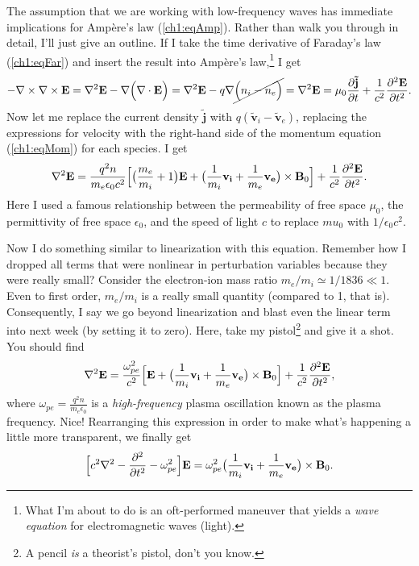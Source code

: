 The assumption that we are working with low-frequency waves has immediate
implications for Amp\`{e}re's law (\ref{ch1:eqAmp}). Rather than walk you
through in detail, I'll just give an outline. If I take the time derivative of
Faraday's law (\ref{ch1:eqFar}) and insert the result into Amp\`{e}re's
law,\footnote{What I'm about to do is an oft-performed maneuver that yields a
  \emph{wave equation} for electromagnetic waves (light).} I get
\begin{equation} - {\bf \nabla} \times {\bf \nabla} \times \mathbf{E} = {\bf \nabla}^2 \mathbf{E} -
  {\bf \nabla} \Big ( {\bf \nabla} \cdot \mathbf{E} \Big ) = {\bf \nabla}^2 \mathbf{E} - q {\bf \nabla}
  \cancel{\Big ( n_i - n_e \Big )} = {\bf \nabla}^2 \mathbf{E} = \mu_0 \dfrac{\partial
    \mathbf{\tilde j}}{\partial t} + \dfrac{1}{c^2} \dfrac{\partial^2
    \mathbf{E}}{\partial t^2}.
\end{equation} 
Now let me replace the current density $\mathbf{\tilde j}$ with
$q ( \mathbf{\tilde v}_i - \mathbf{\tilde v}_e )$, replacing the expressions for
velocity with the right-hand side of the momentum equation (\ref{ch1:eqMom}) for
each species. I get
\begin{equation} {\bf \nabla}^2 \mathbf{E} = \dfrac{q^2 n }{m_e \epsilon_0 c^2} \Big [ \big (
  \dfrac{m_e}{m_i} + 1 \big ) \mathbf{E} + \big ( \dfrac{1}{m_i} \mathbf{v_i} +
  \dfrac{1}{m_e} \mathbf{v_e} \big ) \times \mathbf{B}_0 \Big ] + \dfrac{1}{c^2}
  \dfrac{\partial^2 \mathbf{E}}{\partial t^2}.
\end{equation} 
Here I used a famous relationship between the permeability of free space
$\mu_0$, the permittivity of free space $\epsilon_0$, and the speed of light $c$
to replace $mu_0$ with $1 / \epsilon_0 c^2$. 

Now I do something similar to linearization with this equation. Remember how I
dropped all terms that were nonlinear in perturbation variables because they
were really small? Consider the electron-ion mass ratio
$m_e / m_i \simeq 1 / 1836 \ll 1$. Even to first order, $m_e / m_i$ is a really
small quantity (compared to 1, that is). Consequently, I say we go beyond
linearization and blast even the linear term into next week (by setting it to
zero). Here, take my pistol\footnote{A pencil \emph{is} a theorist's pistol,
  don't you know.} and give it a shot. You should find
\begin{equation} {\bf \nabla}^2 \mathbf{E} = \dfrac{\omega_{pe}^2}{c^2} \Big [
  \mathbf{E} + \big ( \dfrac{1}{m_i} \mathbf{v_i} + \dfrac{1}{m_e} \mathbf{v_e}
  \big ) \times \mathbf{B}_0 \Big ] + \dfrac{1}{c^2} \dfrac{\partial^2
    \mathbf{E}}{\partial t^2},
\end{equation} 
where $\omega_{pe} = \frac{q^2 n}{m_e \epsilon_0}$ is a \emph{high-frequency}
plasma oscillation known as the plasma frequency. Nice!  Rearranging this
expression in order to make what's happening a little more transparent, we finally get
\begin{equation} \Big [ c^2 {\bf \nabla}^2 - \dfrac{\partial^2}{\partial t^2} -
  \omega_{pe}^2 \Big ] \mathbf{E} = \omega_{pe}^2 \big ( \dfrac{1}{m_i}
  \mathbf{v_i} + \dfrac{1}{m_e} \mathbf{v_e} \big ) \times \mathbf{B}_0.
\end{equation} 

